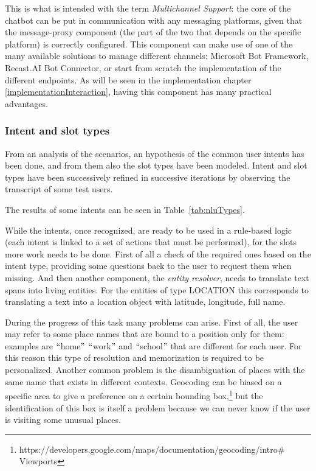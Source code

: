 This is what is intended with the term \textit{Multichannel Support}: the core of the chatbot can be put in communication with any messaging platforms, given that the message-proxy component (the part of the two that depends on the specific platform) is correctly configured. This component can make use of one of the many available solutions to manage different channels: Microsoft Bot Framework, Recast.AI Bot Connector, or start from scratch the implementation of the different endpoints. As will be seen in the implementation chapter \ref{implementationInteraction}, having this component has many practical advantages.

\subsubsection{Intent and slot types}
\label{approachTypes}

From an analysis of the scenarios, an hypothesis of the common user intents has been done, and from them also the slot types have been modeled. Intent and slot types have been successively refined in successive iterations by observing the transcript of some test users.

The results of some intents can be seen in Table~\ref{tab:nluTypes}.



While the intents, once recognized, are ready to be used in a rule-based logic (each intent is linked to a set of actions that must be performed), for the slots more work needs to be done. First of all a check of the required ones based on the intent type, providing some questions back to the user to request them when missing. And then another component, the \textit{entity resolver}, needs to translate text spans into living entities. For the entities of type LOCATION this corresponds to translating a text into a location object with latitude, longitude, full name.

During the progress of this task many problems can arise. First of all, the user may refer to some place names that are bound to a position only for them: examples are $``$home$"$  $``$work$"$  and $``$school$"$  that are different for each user. For this reason this type of resolution and memorization is required to be personalized. Another common problem is the disambiguation of places with the same name that exists in different contexts. Geocoding can be biased on a specific area to give a preference on a certain bounding box,\footnote{ https://developers.google.com/maps/documentation/geocoding/intro$\#$ Viewports  } but the identification of this box is itself a problem because we can never know if the user is visiting some unusual places.

